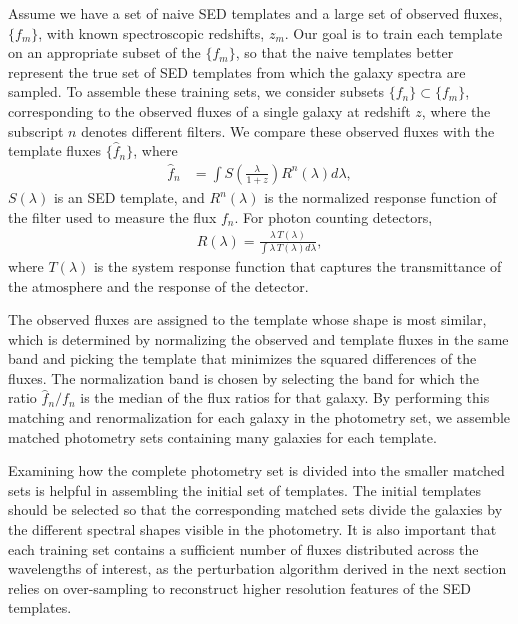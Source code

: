 Assume we have a set of naive SED templates and a large set of observed fluxes, $\{f_m\}$, with known spectroscopic redshifts, $z_m$. 
Our goal is to train each template on an appropriate subset of the $\{f_m\}$, so that the naive templates better represent the true set of SED templates from which the galaxy spectra are sampled. 
To assemble these training sets, we consider subsets $\{f_n\} \subset \{f_m\}$, corresponding to the observed fluxes of a single galaxy at redshift $z$, where the subscript $n$ denotes different filters. 
We compare these observed fluxes with the template fluxes $\{\hat{f}_n\}$, where
\begin{align}
    \hat{f}_n &= \int S\left(\frac{\lambda}{1+z}\right) R^n(\lambda) d\lambda, \label{eq:calc_flux1}
\end{align}
$S(\lambda)$ is an SED template, and $R^n(\lambda)$ is the normalized response function of the filter used to measure the flux $f_n$.
For photon counting detectors,
\begin{align}
    R(\lambda) = \frac{\lambda \, T(\lambda)}{\int \lambda \, T(\lambda) d\lambda},
\end{align}
where $T(\lambda)$ is the system response function that captures the transmittance of the atmosphere and the response of the detector.

The observed fluxes are assigned to the template whose shape is most similar, which is determined by normalizing the observed and template fluxes in the same band and picking the template that minimizes the squared differences of the fluxes. 
The normalization band is chosen by selecting the band for which the ratio $\hat{f}_n / f_n$ is the median of the flux ratios for that galaxy. 
By performing this matching and renormalization for each galaxy in the photometry set, we assemble matched photometry sets containing many galaxies for each template.

Examining how the complete photometry set is divided into the smaller matched sets is helpful in assembling the initial set of templates. 
The initial templates should be selected so that the corresponding matched sets divide the galaxies by the different spectral shapes visible in the photometry. 
It is also important that each training set contains a sufficient number of fluxes distributed across the wavelengths of interest, as the perturbation algorithm derived in the next section relies on over-sampling to reconstruct higher resolution features of the SED templates.




